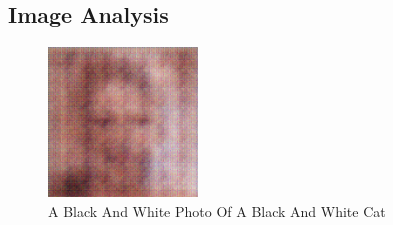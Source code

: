 \documentclass{article}%
\begin{document}
%
\subsection{Image Analysis}%
\label{subsec:ImageAnalysis}%


\begin{figure}[h!]%
\centering%
\includegraphics[width=150px]{500_fake_images/samples_5_31.png}%
\caption{A Black And White Photo Of A Black And White Cat}%
\end{figure}

%
\end{document}
